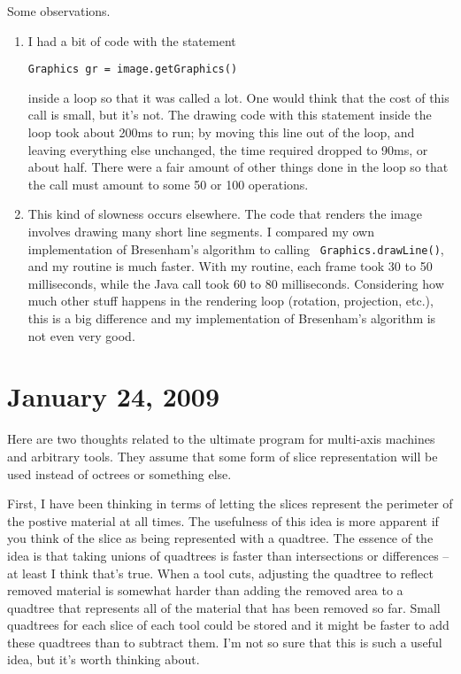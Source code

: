 \documentclass[titlepage,oneside,10pt]{article}
\begin{document}
Some observations.
\begin{enumerate}
\item I had a bit of code with the statement 

{\tt Graphics gr = image.getGraphics()}

inside a loop so that it was called a lot. One would think that the
cost of this call is small, but it's not. The drawing code with this
statement inside the loop took about 200ms to run; by moving this line
out of the loop, and leaving everything else unchanged, the time
required dropped to 90ms, or about half. There were a fair amount of
other things done in the loop so that the call must amount to some 50
or 100 operations.
\item This kind of slowness occurs elsewhere. The code that renders
  the image involves drawing many short line segments. I compared my
  own implementation of Bresenham's algorithm to calling {\tt
  Graphics.drawLine()}, and my routine is much faster. With my
  routine, each frame took 30 to 50 milliseconds, while the Java call
  took 60 to 80 milliseconds. Considering how much other stuff happens
  in the rendering loop (rotation, projection, etc.), this is a big
  difference and my implementation of Bresenham's algorithm is not
  even very good.
\end{enumerate}

\section{January 24, 2009}

Here are two thoughts related to the ultimate program for multi-axis
machines and arbitrary tools. They assume that some form of slice
representation will be used instead of octrees or something else.

First, I have been thinking in terms of letting the slices represent
the perimeter of the postive material at all times. The usefulness of
this idea is more apparent if you think of the slice as being
represented with a quadtree. The essence of the idea is that taking
unions of quadtrees is faster than intersections or differences -- at
least I think that's true. When a tool cuts, adjusting the quadtree
to reflect removed material is somewhat harder than adding the removed
area to a quadtree that represents all of the material that has been
removed so far. Small quadtrees for each slice of each tool could be
stored and it might be faster to add these quadtrees than to subtract
them. I'm not so sure that this is such a useful idea, but it's worth
thinking about.
\end{document}
